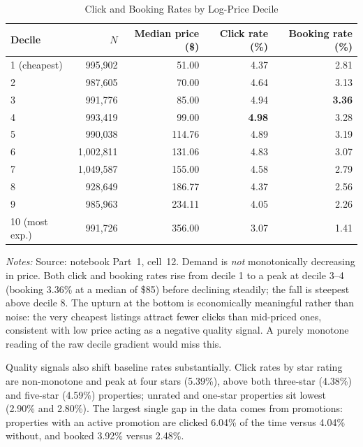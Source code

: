 \documentclass[11pt]{article}
\begin{document}
\begin{table}[htbp]
  \centering
  \caption{Click and Booking Rates by Log-Price Decile}
  \label{tab:deciles}
  \small
  \begin{tabular}{lrrrr}
    \toprule
    Decile & $N$ & Median price (\$) & Click rate (\%) & Booking rate (\%) \\
    \midrule
    1 (cheapest)   &   995,902 &  51.00 & 4.37 & 2.81 \\
    2              &   987,605 &  70.00 & 4.64 & 3.13 \\
    3              &   991,776 &  85.00 & 4.94 & \textbf{3.36} \\
    4              &   993,419 &  99.00 & \textbf{4.98} & 3.28 \\
    5              &   990,038 & 114.76 & 4.89 & 3.19 \\
    6              & 1,002,811 & 131.06 & 4.83 & 3.07 \\
    7              & 1,049,587 & 155.00 & 4.58 & 2.79 \\
    8              &   928,649 & 186.77 & 4.37 & 2.56 \\
    9              &   985,963 & 234.11 & 4.05 & 2.26 \\
    10 (most exp.) &   991,726 & 356.00 & 3.07 & 1.41 \\
    \bottomrule
  \end{tabular}
  \vspace{0.6ex}
  \begin{minipage}{0.9\textwidth}
  \footnotesize \textit{Notes:} Source: notebook Part~1, cell~12. Demand is
  \emph{not} monotonically decreasing in price. Both click and booking rates
  rise from decile 1 to a peak at decile 3--4 (booking 3.36\% at a median of
  \$85) before declining steadily; the fall is steepest above decile 8. The
  upturn at the bottom is economically meaningful rather than noise: the very
  cheapest listings attract fewer clicks than mid-priced ones, consistent with
  low price acting as a negative quality signal. A purely monotone reading of
  the raw decile gradient would miss this.
  \end{minipage}
\end{table}

Quality signals also shift baseline rates substantially. Click rates by star
rating are non-monotone and peak at four stars (5.39\%), above both three-star
(4.38\%) and five-star (4.59\%) properties; unrated and one-star properties sit
lowest (2.90\% and 2.80\%). The largest single gap in the data comes from
promotions: properties with an active promotion are clicked 6.04\% of the time
versus 4.04\% without, and booked 3.92\% versus 2.48\%.
\end{document}
